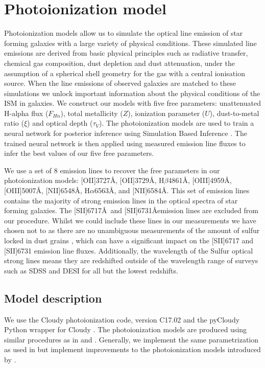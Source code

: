 \documentclass[fleqn,usenatbib]{mnras}
\begin{document}
\section{Photoionization model}
\label{sec:photoionization_model}
Photoionization models allow us to simulate the optical line emission of star forming galaxies with a large variety of physical conditions. These simulated line emissions are derived from basic physical principles such as radiative transfer, chemical gas composition, dust depletion and dust attenuation, under the assumption of a spherical shell geometry for the gas with a central ionisation source. When the line emissions of observed galaxies are matched to these simulations we unlock important information about the physical conditions of the ISM in galaxies. We construct our models with five free parameters: unattenuated H-alpha flux ($F_{H\alpha}$), total metallicity ($Z$), ionization parameter ($U$), dust-to-metal ratio ($\xi$) and optical depth ($\tau_V$). The photoionization models are used to train a neural network for posterior inference using Simulation Based Inference \citep{tejero-cantero2020}. The trained neural network is then applied using measured emission line fluxes to infer the best values of our five free parameters.

We use a set of 8 emission lines to recover the free parameters in our photoionization models: [OII]3727\AA, [OII]3729\AA, H$\beta$4861\AA, [OIII]4959\AA, [OIII]5007\AA, [NII]6548\AA, H$\alpha$6563\AA, and [NII]6584\AA. This set of emission lines contains the majority of strong emission lines in the optical spectra of star forming galaxies. The [SII]6717\AA\ and [SII]6731\AA emission lines are excluded from our procedure. Whilst we could include these lines in our measurements we have chosen not to as there are no unambiguous measurements of the amount of sulfur locked in dust grains \citep{jenkins2009}, which can have a significant impact on the [SII]6717 and [SII]6731 emission line fluxes. Additionally, the wavelength of the Sulfur optical strong lines means they are redshifted outside of the wavelength range of surveys such as SDSS and DESI for all but the lowest redshifts. 

\subsection{Model description}
We use the Cloudy photoionization code, version C17.02 \citep{ferland2017} and the pyCloudy Python wrapper for Cloudy \citep{morisset2013}.  The photoionization models are produced using similar procedures as in \cite{charlot2001, brinchmann2013} and \cite{byler2017}. Generally, we implement the same parametrization as used in \cite{brinchmann2013} but implement improvements to the photoionization models introduced by \cite{byler2017}. 
\end{document}
